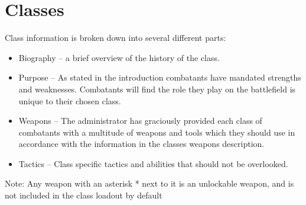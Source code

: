 \section{Classes}

Class information is broken down into several different parts:
\begin{itemize}
	\item Biography – a brief overview of the history of the class.
	\item Purpose – As stated in the introduction combatants have mandated strengths and weaknesses.  Combatants will find the role they play on the battlefield is unique to  their chosen class. 
	\item Weapons – The administrator has graciously provided each class of combatants with a multitude of weapons and tools which they should use in accordance with the information in the classes weapons description. 
	\item Tactics – Class specific tactics and abilities that should not be overlooked.
\end{itemize}
Note: Any weapon with an asterisk * next to it is an unlockable weapon, and is not included in the class loadout by default

\newpage


\newpage


\newpage


\newpage


\newpage


\newpage


\newpage


\newpage


\newpage


\newpage
